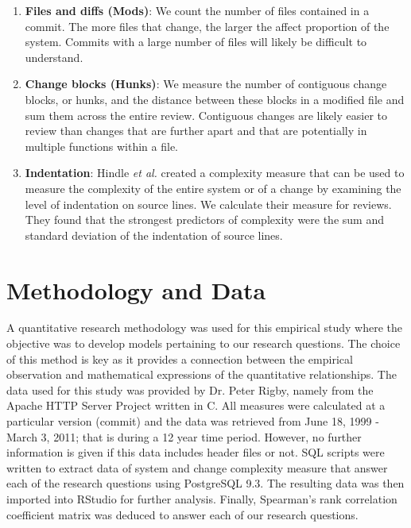 \documentclass[9pt,twocolumn,a4paper]{article}
\begin{document}
\begin{enumerate}

\item{\bf{Files and diffs (Mods)}}: We count the number of files contained in a commit. The more files that change, the larger the affect proportion of the system. Commits with a large number of files will likely be difficult to understand.

\item{\bf{Change blocks (Hunks)}}: We measure the number of contiguous change blocks, or hunks, and the distance between these blocks in a modified file and sum them across the entire review. Contiguous changes are likely easier to review than changes that are further apart and that are potentially in multiple functions within a file.

\item{\bf{Indentation}}: Hindle {\em {et al.}} \cite{Hindle} created a complexity measure that can be used to measure the complexity of the entire system or of a change by examining the level of indentation on source lines. We calculate their measure for reviews. They found that the strongest predictors of complexity were the sum and standard deviation of the indentation of source lines.

\end{enumerate}



\section{Methodology and Data}

A quantitative research methodology was used for this empirical study where the objective was to develop models pertaining to our research questions. The choice of this method is key as it provides a connection between the empirical observation and mathematical expressions of the quantitative relationships. 
The data used for this study was provided by Dr. Peter Rigby, namely from the Apache HTTP Server Project written in C. All measures were calculated at a particular version (commit) and the data was retrieved from June 18, 1999 - March 3, 2011; that is during a 12 year time period. However, no further information is given if this data includes header files or not. SQL scripts were written to extract data of system and change complexity measure that answer each of the research questions using PostgreSQL 9.3. The resulting data was then imported into RStudio for further analysis. Finally, Spearman's rank correlation coefficient matrix was deduced to answer each of our research questions. 
\end{document}
